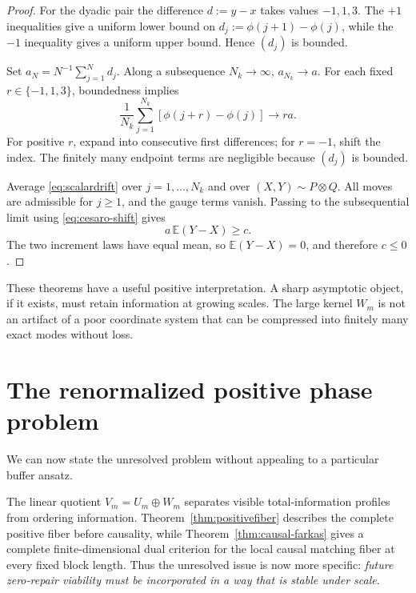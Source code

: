 \documentclass[11pt,a4paper]{article}
\theoremstyle{definition}
\theoremstyle{remark}
\newcommand{\E}{\mathbb E}
\begin{document}
\begin{proof}
For the dyadic pair the difference \(d:=y-x\) takes values \(-1,1,3\).
The \(+1\) inequalities give a uniform lower bound on
\(d_j:=\phi(j+1)-\phi(j)\), while the \(-1\) inequality gives a uniform upper
bound.  Hence \((d_j)\) is bounded.

Set \(a_N=N^{-1}\sum_{j=1}^N d_j\).  Along a subsequence
\(N_k\to\infty\), \(a_{N_k}\to a\).  For each fixed
\(r\in\{-1,1,3\}\), boundedness implies
\begin{equation}
 \frac1{N_k}\sum_{j=1}^{N_k}[\phi(j+r)-\phi(j)]\longrightarrow ra.
 \label{eq:cesaro-shift}
\end{equation}
For positive \(r\), expand into consecutive first differences; for \(r=-1\),
shift the index.  The finitely many endpoint terms are negligible because
\((d_j)\) is bounded.

Average \eqref{eq:scalardrift} over \(j=1,\ldots,N_k\) and over
\((X,Y)\sim P\otimes Q\).  All moves are admissible for \(j\ge1\), and the
gauge terms vanish.  Passing to the subsequential limit using
\eqref{eq:cesaro-shift} gives
\[
 a\,\E(Y-X)\ge c.
\]
The two increment laws have equal mean, so \(\E(Y-X)=0\), and therefore
\(c\le0\).
\end{proof}

These theorems have a useful positive interpretation.  A sharp asymptotic
object, if it exists, must retain information at growing scales.  The large
kernel $W_m$ is not an artifact of a poor coordinate system that can be
compressed into finitely many exact modes without loss.

\section{The renormalized positive phase problem}
\label{sec:renormproblem}

We can now state the unresolved problem without appealing to a particular
buffer ansatz.

The linear quotient $V_m=U_m\oplus W_m$ separates visible total-information
profiles from ordering information.  Theorem~\ref{thm:positivefiber} describes
the complete positive fiber before causality, while
Theorem~\ref{thm:causal-farkas} gives a complete finite-dimensional dual
criterion for the local causal matching fiber at every fixed block length.
Thus the unresolved issue is now more specific: \emph{future zero-repair
viability must be incorporated in a way that is stable under scale}.
\end{document}
